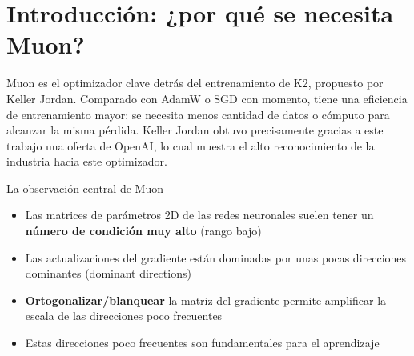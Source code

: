 \section{Introducción: ¿por qué se necesita Muon?}

Muon es el optimizador clave detrás del entrenamiento de K2, propuesto por Keller Jordan. Comparado con AdamW o SGD con momento, tiene una eficiencia de entrenamiento mayor: se necesita menos cantidad de datos o cómputo para alcanzar la misma pérdida. Keller Jordan obtuvo precisamente gracias a este trabajo una oferta de OpenAI, lo cual muestra el alto reconocimiento de la industria hacia este optimizador.

\begin{importantbox}{La observación central de Muon}
\begin{itemize}
  \item Las matrices de parámetros 2D de las redes neuronales suelen tener un \textbf{número de condición muy alto} (rango bajo)
  \item Las actualizaciones del gradiente están dominadas por unas pocas direcciones dominantes (dominant directions)
  \item \textbf{Ortogonalizar/blanquear} la matriz del gradiente permite amplificar la escala de las direcciones poco frecuentes
  \item Estas direcciones poco frecuentes son fundamentales para el aprendizaje
\end{itemize}
\end{importantbox}
